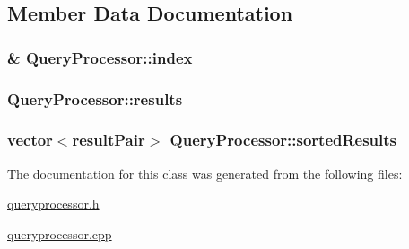 \subsection{Member Data Documentation}
\hypertarget{class_query_processor_af0fe42043ab2eb42da9f911d842fbed5}{}
\subsubsection[{index}]{\& Query\+Processor\+::index\hspace{0.3cm}{\ttfamily [private]}}\label{class_query_processor_af0fe42043ab2eb42da9f911d842fbed5}
\hypertarget{class_query_processor_ab0f6ff6ab22675a201902135bab6809e}{}
\subsubsection[{results}]{ Query\+Processor\+::results\hspace{0.3cm}{\ttfamily [private]}}\label{class_query_processor_ab0f6ff6ab22675a201902135bab6809e}
\hypertarget{class_query_processor_a443576fbb0c7749c7b69ccbd69f0eb58}{}
\subsubsection[{sorted\+Results}]{\setlength{\rightskip}{0pt plus 5cm}vector$<${\bf result\+Pair}$>$ Query\+Processor\+::sorted\+Results\hspace{0.3cm}{\ttfamily [private]}}\label{class_query_processor_a443576fbb0c7749c7b69ccbd69f0eb58}


The documentation for this class was generated from the following files\+:\begin{DoxyCompactItemize}
\item 
\hyperlink{queryprocessor_8h}{queryprocessor.\+h}\item 
\hyperlink{queryprocessor_8cpp}{queryprocessor.\+cpp}\end{DoxyCompactItemize}
